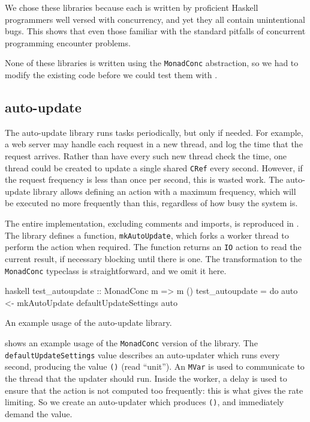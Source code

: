 We chose these libraries because each is written by proficient Haskell
programmers well versed with concurrency, and yet they all contain
unintentional bugs.  This shows that even those familiar with the
standard pitfalls of concurrent programming encounter problems.

None of these libraries is written using the \verb|MonadConc|
abstraction, so we had to modify the existing code before we could
test them with \dejafu{}.

\subsection{auto-update}

The auto-update library\cite{auto_update} runs tasks periodically, but
only if needed.  For example, a web server may handle each request in
a new thread, and log the time that the request arrives.  Rather than
have every such new thread check the time, one thread could be created
to update a single shared \verb|CRef| every second.  However, if the
request frequency is less than once per second, this is wasted work.
The auto-update library allows defining an action with a maximum
frequency, which will be executed no more frequently than this,
regardless of how busy the system is.

The entire implementation, excluding comments and imports, is
reproduced in .  The library defines a function,
\verb|mkAutoUpdate|, which forks a worker thread to perform the action
when required.  The function returns an \verb|IO| action to read the
current result, if necessary blocking until there is one.  The
transformation to the \verb|MonadConc| typeclass is straightforward,
and we omit it here.

\begin{listing}
\centering
\begin{cminted}{haskell}
test_autoupdate :: MonadConc m => m ()
test_autoupdate = do
  auto <- mkAutoUpdate defaultUpdateSettings
  auto
\end{cminted}
\caption{An example usage of the auto-update library.}\label{lst:autoupdate_example1}
\end{listing}

 shows an example usage of the
\verb|MonadConc| version of the library.  The
\verb|defaultUpdateSettings| value describes an auto-updater which
runs every second, producing the value \verb|()| (read ``unit'').  An
\verb|MVar| is used to communicate to the thread that the updater
should run.  Inside the worker, a delay is used to ensure that the
action is not computed too frequently: this is what gives the rate
limiting.  So we create an auto-updater which produces \verb|()|, and
immediately demand the value.

